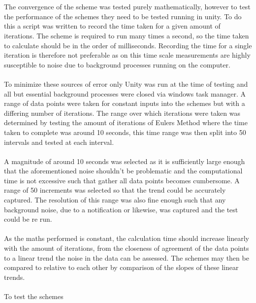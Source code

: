 \\\\
The convergence of the scheme was tested purely mathematically, however to test the performance of the schemes they need to be tested running in unity. To do this a script was written to record the time taken for a given amount of iterations. The scheme is required to run many times a second, so the time taken to calculate should be in the order of milliseconds. Recording the time for a single iteration is therefore not preferable as on this time scale measurements are highly susceptible to noise due to background processes running on the computer. 
\\\\
To minimize these sources of error only Unity was run at the time of testing and all but essential background processes were closed via windows task manager. A range of data points were taken for constant inputs into the schemes but with a differing number of iterations. The range over which iterations were taken was determined by testing the amount of iterations of Eulers Method where the time taken to complete was around 10 seconds, this time range was then split into 50 intervals and tested at each interval. 
\\\\
A magnitude of around 10 seconds was selected as it is sufficiently large enough that the aforementioned noise shouldn't be problematic and the computational time is not excessive such that gather all data points becomes cumbersome. A range of 50 increments was selected so that the trend could be accurately captured. The resolution of this range was also fine enough such that any background noise, due to a notification or likewise, was captured and the test could be re run. 
\\\\
As the maths performed is constant, the calculation time should increase linearly with the amount of iterations, from the closeness of agreement of the data points to a linear trend the noise in the data can be assessed. The schemes may then be compared to relative to each other by comparison of the slopes of these linear trends. 
\\\\
To test the schemes